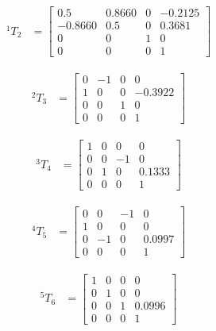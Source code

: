 \documentclass[fleqn]{article}
\begin{document}
\begin{equation}
\begin{split}
^{1}T_{2}&=\begin{bmatrix}
0.5 & 0.8660 & 0 & -0.2125\\
-0.8660 & 0.5 & 0 & 0.3681\\
0 & 0 & 1 & 0\\
0 & 0 & 0 & 1
\end{bmatrix}
\end{split}
\end{equation}

\begin{equation}
\begin{split}
^{2}T_{3}&=\begin{bmatrix}
0 & -1 & 0 & 0\\
1 & 0 & 0 & -0.3922\\
0 & 0 & 1 & 0\\
0 & 0 & 0 & 1
\end{bmatrix}
\end{split}
\end{equation}

\begin{equation}
\begin{split}
^{3}T_{4}&=\begin{bmatrix}
1 & 0 & 0 & 0\\
0 & 0 & -1 & 0\\
0 & 1 & 0 & 0.1333\\
0 & 0 & 0 & 1
\end{bmatrix}
\end{split}
\end{equation}

\begin{equation}
\begin{split}
^{4}T_{5}&=\begin{bmatrix}
0 & 0 & -1 & 0\\
1 & 0 & 0 & 0\\
0 & -1 & 0 & 0.0997\\
0 & 0 & 0 & 1
\end{bmatrix}
\end{split}
\end{equation}

\begin{equation}
\begin{split}
^{5}T_{6}&=\begin{bmatrix}
1 & 0 & 0 & 0\\
0 & 1 & 0 & 0\\
0 & 0 & 1 & 0.0996\\
0 & 0 & 0 & 1
\end{bmatrix}
\end{split}
\end{equation}
\end{document}
